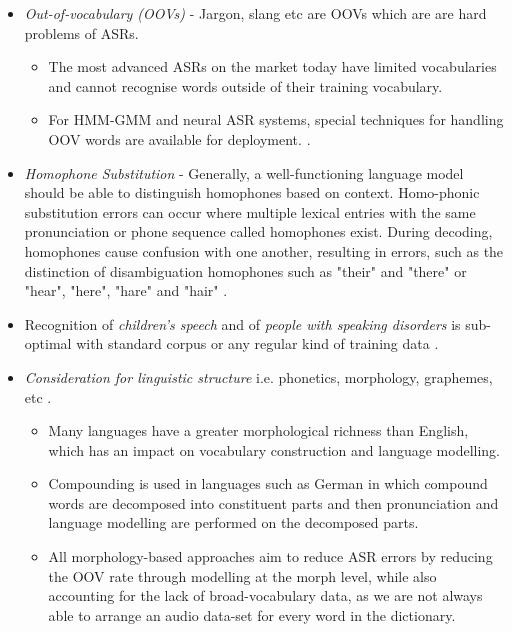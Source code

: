 \begin{itemize}
    \item \textit{Out-of-vocabulary (OOVs)} - Jargon, slang etc are OOVs which are are hard problems of ASRs. 
    \begin{itemize}
        \item The most advanced ASRs on the market today have limited vocabularies and cannot recognise words outside of their training vocabulary.
        \item  For HMM-GMM and neural ASR systems, special techniques for handling OOV words are available for deployment. \cite{zhang_strategies_2019}.
    \end{itemize}       
    \item \textit{Homophone Substitution} - Generally, a well-functioning language model should be able to distinguish homophones based on context. Homo-phonic substitution errors can occur where multiple lexical entries with the same pronunciation or phone sequence called homophones exist. During decoding, homophones cause confusion with one another, resulting in errors, such as the distinction of disambiguation homophones such as "their" and "there" or "hear", "here", "hare" and "hair" \cite{vasilescu_cross-lingual_2011}. %
    \item Recognition of \textit{children’s speech} and of \textit{people with speaking disorders} is sub-optimal with standard corpus or any regular kind of training data \cite{kumar_leveraging_2020}.
    \item \textit{Consideration for linguistic structure} i.e. phonetics, morphology, graphemes, etc \cite{creutz_morph-based_2007, backstrom_introduction_2022}. 
    \begin{itemize}
        \item Many languages have a greater morphological richness than English, which has an impact on vocabulary construction and language modelling.
        \item Compounding is used in languages such as German in which compound words are decomposed into constituent parts and then pronunciation and language modelling are performed on the decomposed parts.
        \item All morphology-based approaches aim to reduce ASR errors by reducing the OOV rate through modelling at the morph level, while also accounting for the lack of broad-vocabulary data, as we are not always able to arrange an audio data-set for every word in the dictionary. 

\end{itemize}
\end{itemize}
